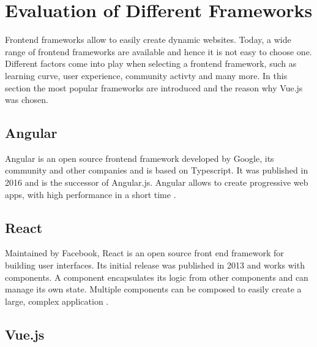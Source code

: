 \chapter{Evaluation of Different Frameworks}


Frontend frameworks allow to easily create dynamic websites. Today, a wide range of frontend frameworks are available and hence it is not easy to choose one. Different factors come into play when selecting a frontend framework, such as learning curve, user experience, community activty and many more. In this section the most popular frameworks are introduced and the reason why Vue.js was chosen.

\section{Angular}

Angular is an open source frontend framework developed by Google, its community and other companies and is based on Typescript. It was published in 2016 and is the successor of Angular.js. Angular allows to create progressive web apps, with high performance in a short time \cite{Angular}.


\section{React}

Maintained by Facebook, React is an open source front end framework for building user interfaces. Its initial release was published in 2013 and works with components. A component encapsulates its logic from other components and can manage its own state. Multiple components can be composed to easily create a large, complex application \cite{React}.

\section{Vue.js}

